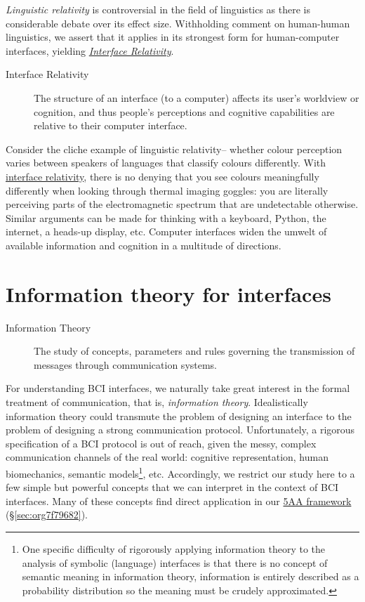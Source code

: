 \documentclass[logo,bsc,singlespacing,parskip]{infthesis}
\begin{document}
\emph{Linguistic relativity} is controversial in the field of linguistics as there is considerable debate over its effect size.
Withholding comment on human-human linguistics, we assert that it applies in its strongest form for human-computer interfaces, yielding \emph{\hyperref[orga30ac29]{Interface Relativity}}.

\begin{mdframed}
\begin{description}
\item[{\label{orga30ac29}Interface Relativity}] The structure of an interface (to a computer) affects its user's worldview or cognition, and thus people's perceptions and cognitive capabilities are relative to their computer interface.
\end{description}
\end{mdframed}

Consider the cliche example of linguistic relativity-- whether colour perception varies between speakers of languages that classify colours differently.
With \hyperref[orga30ac29]{interface relativity}, there is no denying that you see colours meaningfully differently when looking through thermal imaging goggles: you are literally perceiving parts of the electromagnetic spectrum that are undetectable otherwise.
Similar arguments can be made for thinking with a keyboard, Python, the internet, a heads-up display, etc.
Computer interfaces widen the umwelt of available information and cognition in a multitude of directions.

\section{Information theory for interfaces}
\label{sec:org94f7b3f}
\begin{mdframed}
\begin{description}
\item[{Information Theory\label{information theory}}] The study of concepts, parameters and rules governing the transmission of messages through communication systems.
\end{description}
\end{mdframed}

For understanding BCI interfaces, we naturally take great interest in the formal treatment of communication, that is, \emph{information theory}.
Idealistically information theory could transmute the problem of designing an interface to the problem of designing a strong communication protocol.
Unfortunately, a rigorous specification of a BCI protocol is out of reach, given the messy, complex communication channels of the real world: cognitive representation, human biomechanics, semantic models\footnote{One specific difficulty of rigorously applying information theory to the analysis of symbolic (language) interfaces is that there is no concept of semantic meaning in information theory, information is entirely described as a probability distribution so the meaning must be crudely approximated.}, etc.
Accordingly, we restrict our study here to a few simple but powerful concepts that we can interpret in the context of BCI interfaces.
Many of these concepts find direct application in our \hyperref[sec:org7f79682]{5AA framework} (\S \ref{sec:org7f79682}).
\end{document}
